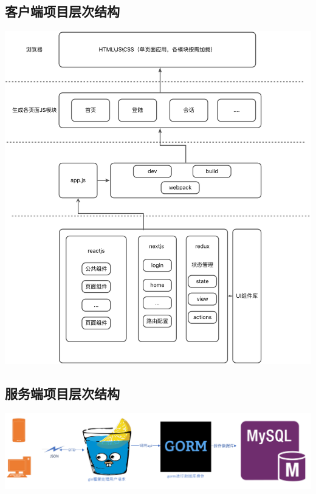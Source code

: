 \documentclass[utf8,a4paper,20pt]{article}
\begin{document}
\subsection{客户端项目层次结构}
\includegraphics[width=\linewidth]{./assets/client.jpg}
\subsection{服务端项目层次结构}
\includegraphics[width=\linewidth]{./assets/server.png}
\end{document}
